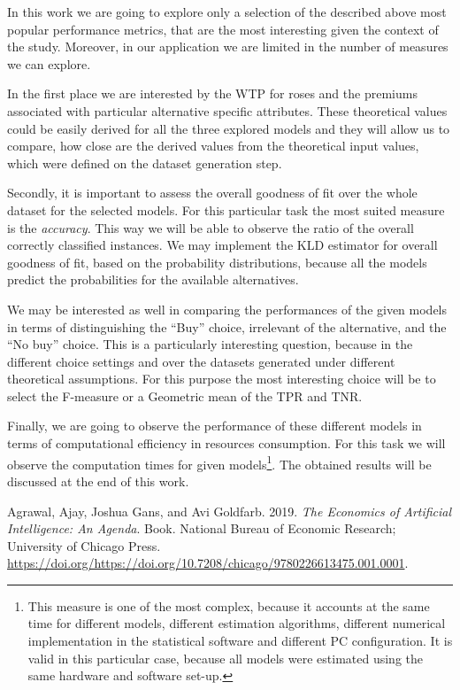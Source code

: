 \documentclass[11pt,]{article}
\let\rmarkdownfootnote\footnote%
\def\footnote{\protect\rmarkdownfootnote}
\begin{document}
In this work we are going to explore only a selection of the described
above most popular performance metrics, that are the most interesting
given the context of the study. Moreover, in our application we are
limited in the number of measures we can explore.

In the first place we are interested by the WTP for roses and the
premiums associated with particular alternative specific attributes.
These theoretical values could be easily derived for all the three
explored models and they will allow us to compare, how close are the
derived values from the theoretical input values, which were defined on
the dataset generation step.

Secondly, it is important to assess the overall goodness of fit over the
whole dataset for the selected models. For this particular task the most
suited measure is the \emph{accuracy}. This way we will be able to
observe the ratio of the overall correctly classified instances. We may
implement the KLD estimator for overall goodness of fit, based on the
probability distributions, because all the models predict the
probabilities for the available alternatives.

We may be interested as well in comparing the performances of the given
models in terms of distinguishing the ``Buy'' choice, irrelevant of the
alternative, and the ``No buy'' choice. This is a particularly
interesting question, because in the different choice settings and over
the datasets generated under different theoretical assumptions. For this
purpose the most interesting choice will be to select the F-measure or a
Geometric mean of the TPR and TNR.

Finally, we are going to observe the performance of these different
models in terms of computational efficiency in resources consumption.
For this task we will observe the computation times for given
models\footnote{This measure is one of the most complex, because it
  accounts at the same time for different models, different estimation
  algorithms, different numerical implementation in the statistical
  software and different PC configuration. It is valid in this
  particular case, because all models were estimated using the same
  hardware and software set-up.}. The obtained results will be discussed
at the end of this work.

\newpage

\hypertarget{refs}{}
\leavevmode\hypertarget{ref-agrawal2019nber}{}%
Agrawal, Ajay, Joshua Gans, and Avi Goldfarb. 2019. \emph{The Economics
of Artificial Intelligence: An Agenda}. Book. National Bureau of
Economic Research; University of Chicago Press.
\url{https://doi.org/https://doi.org/10.7208/chicago/9780226613475.001.0001}.
\end{document}
